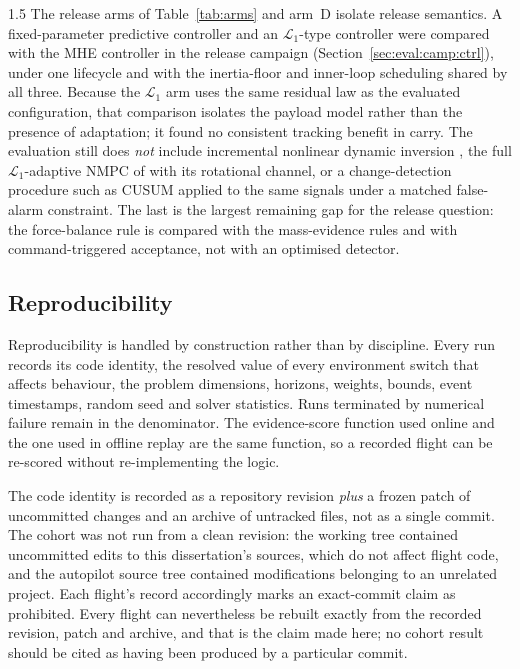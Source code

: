 \begin{spacing}{1.5}
The release arms of Table~\ref{tab:arms} and arm~D isolate release semantics.
A fixed-parameter predictive controller and an $\mathcal{L}_1$-type controller
were compared with the MHE controller in the release campaign
(Section~\ref{sec:eval:camp:ctrl}), under one lifecycle and with the
inertia-floor and inner-loop scheduling shared by all three. Because the
$\mathcal{L}_1$ arm uses the same residual law as the evaluated configuration,
that comparison isolates the payload model rather than the presence of
adaptation; it found no consistent tracking benefit in carry. The evaluation
still does \emph{not} include incremental nonlinear dynamic inversion
\cite{smeur}, the full $\mathcal{L}_1$-adaptive NMPC of \cite{hanover2021}
with its rotational channel, or a change-detection procedure such as CUSUM
\cite{basseville1993} applied to the same signals under a matched false-alarm
constraint. The last is the largest remaining gap for the release question: the
force-balance rule is compared with the mass-evidence rules and with
command-triggered acceptance, not with an optimised detector.

\subsection{Reproducibility}\label{sec:eval:repro}

Reproducibility is handled by construction rather than by discipline. Every run
records its code identity, the resolved value of every environment switch
that affects behaviour, the problem dimensions, horizons, weights, bounds, event
timestamps, random seed and solver statistics. Runs terminated by numerical
failure remain in the denominator. The evidence-score function used online and the one used in
offline replay are the same function, so a recorded flight can be re-scored
without re-implementing the logic.

The code identity is recorded as a repository revision \emph{plus} a frozen
patch of uncommitted changes and an archive of untracked files, not as a single
commit. The cohort was not run from a clean revision: the working tree contained
uncommitted edits to this dissertation's sources, which do not affect flight
code, and the autopilot source tree contained modifications belonging to an
unrelated project. Each flight's record accordingly marks an exact-commit claim as
prohibited. Every flight can nevertheless be rebuilt exactly from the recorded
revision, patch and archive, and that is the claim made here; no cohort result
should be cited as having been produced by a particular commit.


\end{spacing}
